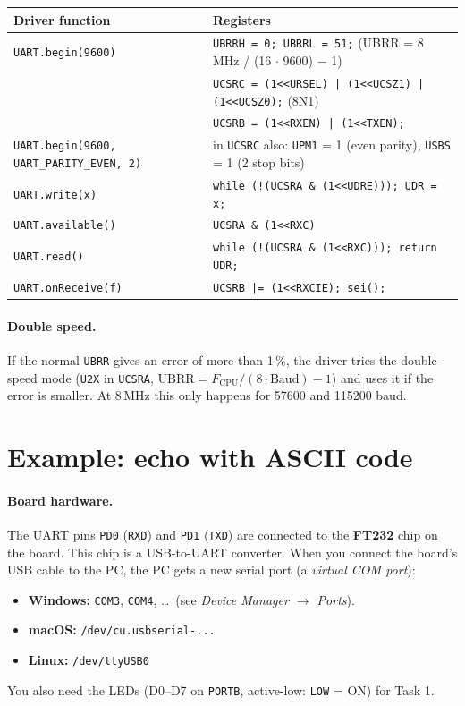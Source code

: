 \documentclass[11pt,a4paper]{article}
\newcommand{\code}[1]{\texttt{#1}}
\begin{document}
\begin{center}
\small
{\footnotesize\begin{tabular}{@{}ll@{}}
\toprule
\textbf{Driver function} & \textbf{Registers} \\
\midrule
\code{UART.begin(9600)} & \code{UBRRH = 0; UBRRL = 51;} \quad (UBRR = 8\,MHz / (16 $\cdot$ 9600) $-$ 1) \\
                        & \code{UCSRC = (1<{}<URSEL) | (1<{}<UCSZ1) | (1<{}<UCSZ0);} \quad (8N1) \\
                        & \code{UCSRB = (1<{}<RXEN) | (1<{}<TXEN);} \\
\code{UART.begin(9600, UART\_PARITY\_EVEN, 2)} & in \code{UCSRC} also: \code{UPM1} = 1 (even parity), \code{USBS} = 1 (2 stop bits) \\
\code{UART.write(x)} & \code{while (!(UCSRA \& (1<{}<UDRE)));  UDR = x;} \\
\code{UART.available()} & \code{UCSRA \& (1<{}<RXC)} \\
\code{UART.read()} & \code{while (!(UCSRA \& (1<{}<RXC)));  return UDR;} \\
\code{UART.onReceive(f)} & \code{UCSRB |= (1<{}<RXCIE); sei();} \\
\bottomrule
\end{tabular}}
\end{center}

\paragraph{Double speed.} If the normal \code{UBRR} gives an error of more than
1\,\%, the driver tries the double-speed mode (\code{U2X} in \code{UCSRA},
$\text{UBRR} = F_{\text{CPU}} / (8 \cdot \text{Baud}) - 1$) and uses it if the
error is smaller. At 8\,MHz this only happens for 57600 and 115200 baud.

\newpage
\section{Example: echo with ASCII code}

\paragraph{Board hardware.} The UART pins \code{PD0} (\code{RXD}) and \code{PD1}
(\code{TXD}) are connected to the \textbf{FT232} chip on the board. This chip
is a USB-to-UART converter. When you connect the board's USB cable to the PC,
the PC gets a new serial port (a \emph{virtual COM port}):
\begin{itemize}
  \item \textbf{Windows:} \code{COM3}, \code{COM4}, \dots\ (see \emph{Device Manager $\rightarrow$ Ports}).
  \item \textbf{macOS:} \code{/dev/cu.usbserial-...}
  \item \textbf{Linux:} \code{/dev/ttyUSB0}
\end{itemize}
You also need the LEDs (D0--D7 on \code{PORTB}, active-low: \code{LOW} = ON)
for Task 1.
\end{document}
